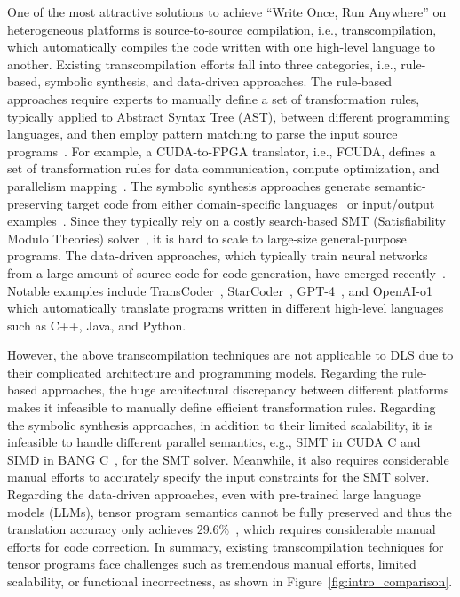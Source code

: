 One of the most attractive solutions to achieve “Write Once, Run Anywhere” on heterogeneous platforms is source-to-source compilation, i.e., transcompilation, which automatically compiles the code written with one high-level language to another. Existing transcompilation efforts fall into three categories, i.e., rule-based, symbolic synthesis, and data-driven approaches. The rule-based approaches require experts to manually define a set of transformation rules, typically applied to Abstract Syntax Tree (AST), between different programming languages, and then employ pattern matching to parse the input source programs~\cite{johnson2022martini,10.1145/3554736}. For example, a CUDA-to-FPGA translator, i.e., FCUDA, defines a set of transformation rules for data communication, compute optimization, and parallelism mapping~\cite{PAPAKONSTANTINOU13TECS}. The symbolic synthesis approaches generate semantic-preserving target code from either domain-specific languages~\cite{Phitchaya14PLDI} or input/output examples~\cite{Jackson22PLDI}. Since they typically rely on a costly search-based SMT (Satisfiability Modulo Theories) solver~\cite{Z3Solver}, it is hard to scale to large-size general-purpose programs. The data-driven approaches, which typically train neural networks from a large amount of source code for code generation, have emerged recently~\cite{bahdanau2014neural,wu2016google,Shah18NIPS}. Notable examples include TransCoder~\cite{Roziere20NIPS},  StarCoder~\cite{li2023starcoder}, GPT-4~\cite{achiam2023gpt}, and OpenAI-o1~\cite{openaio1} which automatically translate programs written in different high-level languages such as C++, Java, and Python.




However, the above transcompilation techniques are not applicable to DLS due to their complicated architecture and programming models. Regarding the rule-based approaches, the huge architectural discrepancy between different platforms makes it infeasible to manually define efficient transformation rules. Regarding the symbolic synthesis approaches, in addition to their limited scalability, it is infeasible to handle different parallel semantics, e.g., SIMT in CUDA C and SIMD in BANG C~\cite{bangc}, for the SMT solver. Meanwhile, it also requires considerable manual efforts to accurately specify the input constraints for the SMT solver. 
Regarding the data-driven approaches, even with pre-trained large language models (LLMs), tensor program semantics cannot be fully preserved and thus the translation accuracy only achieves 29.6\%~\cite{li2022competition}, which requires considerable manual efforts for code correction.
In summary, existing transcompilation techniques for tensor programs face challenges such as tremendous manual efforts, limited scalability, or functional incorrectness, as shown in Figure~\ref{fig:intro_comparison}.



